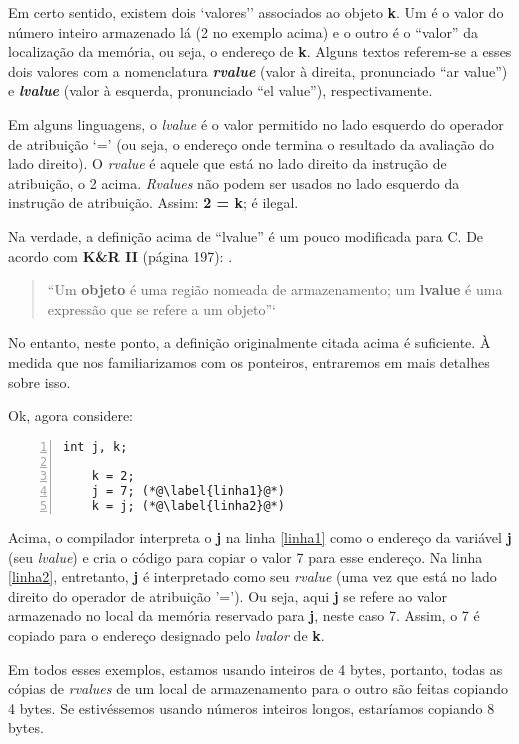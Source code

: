 Em certo sentido, existem dois `valores'' associados ao objeto \textbf{k}. Um é o valor do número inteiro armazenado lá (2 no exemplo acima) e o outro é o ``valor'' da localização da memória, ou seja, o endereço de \textbf{k}. Alguns textos referem-se a esses dois valores com a nomenclatura \textbf{\textit{rvalue}} (valor à direita, pronunciado ``ar value'') e \textbf{\textit{lvalue}} (valor à esquerda, pronunciado ``el value''), respectivamente.

Em alguns linguagens, o \textit{lvalue} é o valor permitido no lado esquerdo do operador de atribuição `=' (ou seja, o endereço onde termina o resultado da avaliação do lado direito). O \textit{rvalue} é aquele que está no lado direito da instrução de atribuição, o 2 acima. \textit{Rvalues} não podem ser usados no lado esquerdo da instrução de atribuição. Assim: \textbf{2 = k}; é ilegal.

Na verdade, a definição acima de ``lvalue'' é um pouco modificada para C. De acordo com \textbf{K\&R II} (página 197): \cite{kr}.

\begin{quotation}
	``Um \textbf{objeto} é uma região nomeada de armazenamento; um \textbf{lvalue} é uma expressão que se refere a um objeto''`
\end{quotation}

No entanto, neste ponto, a definição originalmente citada acima é suficiente. À medida que nos familiarizamos com os ponteiros, entraremos em mais detalhes sobre isso.

Ok, agora considere:

\begin{lstlisting}[numbers=left, numberstyle=\tiny]
	int j, k;

	k = 2;
	j = 7; (*@\label{linha1}@*)
	k = j; (*@\label{linha2}@*)
\end{lstlisting}

Acima, o compilador interpreta o \textbf{j} na linha \ref{linha1} como o endereço da variável \textbf{j} (seu \textit{lvalue}) e cria o código para copiar o valor 7 para esse endereço. Na linha \ref{linha2}, entretanto, \textbf{j} é interpretado como seu \textit{rvalue} (uma vez que está no lado direito do operador de atribuição '='). Ou seja, aqui \textbf{j} se refere ao valor armazenado no local da memória reservado para \textbf{j}, neste caso 7. Assim, o 7 é copiado para o endereço designado pelo \textit{lvalor} de \textbf{k}.

Em todos esses exemplos, estamos usando inteiros de 4 bytes, portanto, todas as cópias de \textit{rvalues} de um local de armazenamento para o outro são feitas copiando 4 bytes. Se estivéssemos usando números inteiros longos, estaríamos copiando 8 bytes.

